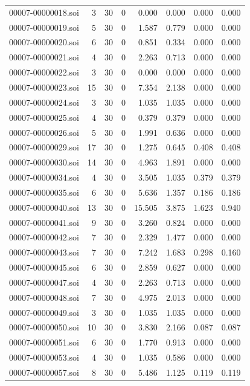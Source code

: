 \begin{tabular}{lrrrrrrr}
00007-00000018.soi & 3 & 30 & 0 & 0.000 & 0.000 & 0.000 & 0.000 \\
00007-00000019.soi & 5 & 30 & 0 & 1.587 & 0.779 & 0.000 & 0.000 \\
00007-00000020.soi & 6 & 30 & 0 & 0.851 & 0.334 & 0.000 & 0.000 \\
00007-00000021.soi & 4 & 30 & 0 & 2.263 & 0.713 & 0.000 & 0.000 \\
00007-00000022.soi & 3 & 30 & 0 & 0.000 & 0.000 & 0.000 & 0.000 \\
00007-00000023.soi & 15 & 30 & 0 & 7.354 & 2.138 & 0.000 & 0.000 \\
00007-00000024.soi & 3 & 30 & 0 & 1.035 & 1.035 & 0.000 & 0.000 \\
00007-00000025.soi & 4 & 30 & 0 & 0.379 & 0.379 & 0.000 & 0.000 \\
00007-00000026.soi & 5 & 30 & 0 & 1.991 & 0.636 & 0.000 & 0.000 \\
00007-00000029.soi & 17 & 30 & 0 & 1.275 & 0.645 & 0.408 & 0.408 \\
00007-00000030.soi & 14 & 30 & 0 & 4.963 & 1.891 & 0.000 & 0.000 \\
00007-00000034.soi & 4 & 30 & 0 & 3.505 & 1.035 & 0.379 & 0.379 \\
00007-00000035.soi & 6 & 30 & 0 & 5.636 & 1.357 & 0.186 & 0.186 \\
00007-00000040.soi & 13 & 30 & 0 & 15.505 & 3.875 & 1.623 & 0.940 \\
00007-00000041.soi & 9 & 30 & 0 & 3.260 & 0.824 & 0.000 & 0.000 \\
00007-00000042.soi & 7 & 30 & 0 & 2.329 & 1.477 & 0.000 & 0.000 \\
00007-00000043.soi & 7 & 30 & 0 & 7.242 & 1.683 & 0.298 & 0.160 \\
00007-00000045.soi & 6 & 30 & 0 & 2.859 & 0.627 & 0.000 & 0.000 \\
00007-00000047.soi & 4 & 30 & 0 & 2.263 & 0.713 & 0.000 & 0.000 \\
00007-00000048.soi & 7 & 30 & 0 & 4.975 & 2.013 & 0.000 & 0.000 \\
00007-00000049.soi & 3 & 30 & 0 & 1.035 & 1.035 & 0.000 & 0.000 \\
00007-00000050.soi & 10 & 30 & 0 & 3.830 & 2.166 & 0.087 & 0.087 \\
00007-00000051.soi & 6 & 30 & 0 & 1.770 & 0.913 & 0.000 & 0.000 \\
00007-00000053.soi & 4 & 30 & 0 & 1.035 & 0.586 & 0.000 & 0.000 \\
00007-00000057.soi & 8 & 30 & 0 & 5.486 & 1.125 & 0.119 & 0.119 \\

\end{tabular}
